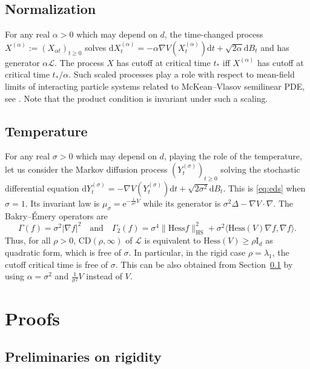 \documentclass[10pt,reqno]{amsart}
\numberwithin{equation}{section}
\begin{document}
\subsection{Normalization}\label{ss:normalization}

For any real $\alpha>0$ which may depend on $d$, the time-changed process
$X^{(\alpha)}:={(X_{\alpha t})}_{t\geq0}$ solves 
$\mathrm{d}X^{(\alpha)}_t=-\alpha\nabla
V(X^{(\alpha)}_t)\mathrm{d}t+\sqrt{2\alpha}\mathrm{d}B_t$ and has generator
$\alpha\mathcal{L}$. The process $X$ has cutoff at critical time
$t_*$ iff $X^{(\alpha)}$ has cutoff at critical time $t_*/\alpha$.
Such scaled processes play a role with respect to mean-field limits of
interacting particle systems related to McKean--Vlasov semilinear PDE, see
\cite{BCL23}. Note that the product condition is invariant under such a scaling. 

\subsection{Temperature}

For any real $\sigma>0$ which may depend on $d$, playing the role of the
temperature, let us consider the Markov diffusion process
${(Y^{(\sigma)}_t)}_{t\geq0}$ solving the stochastic differential equation
$\mathrm{d}Y^{(\sigma)}_t=-\nabla
V(Y^{(\sigma)}_t)\mathrm{d}t+\sqrt{2\sigma^2}\mathrm{d}B_t$. This is
\eqref{eq:eds} when $\sigma=1$. Its invariant law is
$\mu_\sigma=\mathrm{e}^{-\frac{1}{\sigma^2}V}$ while its generator is
$\sigma^2\Delta-\nabla V\cdot\nabla$. The Bakry--Émery operators are
 \begin{equation}
     \Gamma(f)=\sigma^2|\nabla f|^2
     \quad\text{and}\quad
     \Gamma_2(f)=\sigma^4\|\mathrm{Hess}f\|_{\mathrm{HS}}^2+\sigma^2\langle\mathrm{Hess}(V)\nabla f,\nabla f\rangle.
 \end{equation}
 Thus, for all $\rho>0$, $\mathrm{CD}(\rho,\infty)$ of $\mathcal{L}$ is equivalent to
 $\mathrm{Hess}(V)\geq\rho\mathrm{I}_d$ as quadratic form, which is free of
 $\sigma$. In particular, in the rigid case $\rho=\lambda_1$, the cutoff
 critical time is free of $\sigma$. This can be also obtained from
 Section~\ref{ss:normalization} by using $\alpha=\sigma^2$ and
 $\frac{1}{\sigma^2}V$ instead of $V$.

\section{Proofs}

\subsection{Preliminaries on rigidity}
\end{document}
